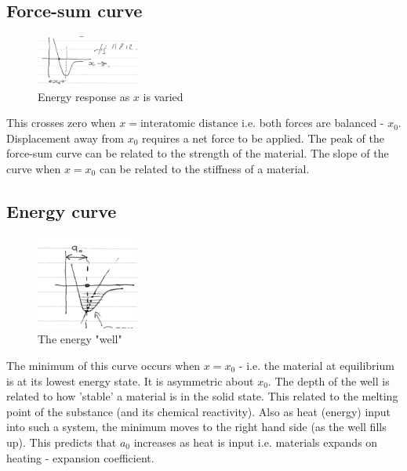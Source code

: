 \documentclass[class=report, crop=false, 12pt,a4paper]{standalone}
\begin{document}
\subsection{Force-sum curve}
\begin{figure}[h]
  \centering
  \includegraphics[width = 0.3\textwidth]{../img/energyresponse}
  \caption{Energy response as $x$ is varied}
  \label{fig:energyresponse}
\end{figure}
This crosses zero when $x = \textrm{interatomic distance}$ i.e. both forces are balanced - $x_0$. Displacement away from $x_0$ requires a net force to be applied. The peak of the force-sum curve can be related to the strength of the material. The slope of the curve when $x=x_0$ can be related to the stiffness of a material.
\subsection{Energy curve}
\begin{figure}[h]
  \centering
  \includegraphics[width = 0.3\textwidth]{../img/energywell}
  \caption{The energy "well"}
  \label{fig:energycurve}
\end{figure}
The minimum of this curve occurs when $x=x_0$ - i.e. the material at equilibrium is at its lowest energy state. It is asymmetric about $x_0$. The depth of the well is related to how 'stable' a material is in the solid state. This related to the melting point of the substance (and its chemical reactivity). Also as heat (energy) input into such a system, the minimum moves to the right hand side (as the well fills up). This predicts that $a_0$ increases as heat is input i.e. materials expands on heating - expansion coefficient.
\end{document}

